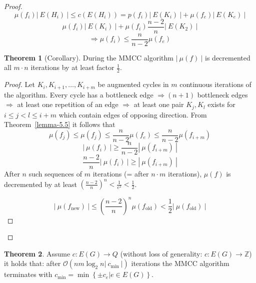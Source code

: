 \documentclass[a4paper]{article}
\theoremstyle{definition}
\newtheorem{theorem}{Theorem}
\newcommand{\card}[1]{\left|\:\!#1\:\!\right|}
\newcommand{\set}[1]{\left\{#1\right\}}
\begin{document}
\begin{proof}
  \[ \mu(f_i) \card{E(H_i)} \leq c(E(H_i)) = p(f_i) \card{E(K_i)} + \mu(f_e)\card{E(K_e)} \]
  \[ \mu(f_i) \card{E(K_i)} + \mu(f_i) \frac{n-2}{n} \card{E(K_2)} \]
  \[ \Rightarrow \mu(f_i) \leq \frac{n}{n-2} \mu(f_e) \]

  \begin{theorem}[Corollary]
    During the MMCC algorithm $\card{\mu(f)}$ is decremented all $m\cdot n$ iterations by at least factor $\frac12$.
  \end{theorem}
  \begin{proof}
    Let $K_i, K_{i+1}, \ldots, K_{i+m}$ be augmented cycles in $m$ continuous iterations of the algorithm.
    Every cycle has a bottleneck edge $\Rightarrow (n+1)$ bottleneck edges $\Rightarrow$ at least one repetition of an edge $\Rightarrow$ at least one pair $K_j, K_l$ exists for $i \leq j < l \leq i + m$ which contain edges of opposing direction. From Theorem~\ref{lemma-5.5} it follows that
    \[
      \mu(f_j) \leq \mu(f_j) \leq \frac{n}{n-2} \mu(f_e) \leq \frac{n}{n-2} \mu(f_{i+m})
    \] \[
      \card{\mu(f_i)} \geq \frac{n}{n-2} \card{\mu(f_{i+m})}
    \] \[
      \frac{n-2}{n} \card{\mu(f_i)} \geq \card{\mu(f_{i+m})}
    \]
    After $n$ such sequences of $m$ iterations (= after $n\cdot m$ iterations), $\mu(f)$ is decremented by at least $\left(\frac{n-2}{n}\right)^n < \frac{1}{e^2} < \frac12$.

    \[
      \card{\mu(f_{\text{new}})} \leq \left(\frac{n-2}{n}\right)^n \mu(f_{\text{old}}) < \frac12 \card{\mu(f_{\text{old}})}
    \]
  \end{proof}
\end{proof}

\begin{theorem}\label{proposition-5.6}
  Assume $c: E(G) \rightarrow Q$ (without loss of generality: $c: E(G) \rightarrow \mathbb{Z}$) it holds that:
  after $\mathcal{O}(nm \log_2{n} \card{c_{\text{min}}})$ iterations the MMCC algorithm terminates with
  $c_{\text{min}} = \min\set{\pm c_e | e \in E(G)}$.
\end{theorem}
\end{document}
